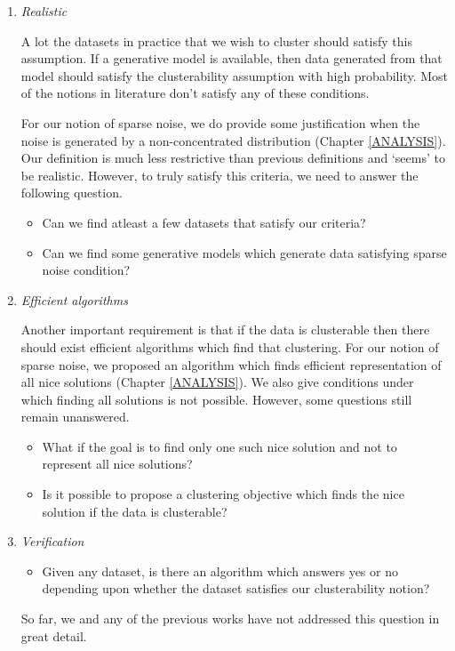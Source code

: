 \documentclass[letterpaper,12pt,titlepage,oneside,final]{book}
\begin{document}
\begin{enumerate}
\item \emph{Realistic}

A lot the datasets in practice that we wish to cluster should satisfy this assumption. If a generative model is available, then data generated from that model should satisfy the clusterability assumption with high probability. Most of the notions in literature don't satisfy any of these conditions.

For our notion of sparse noise, we do provide some justification when the noise is generated by a non-concentrated distribution (Chapter \ref{ANALYSIS}). Our definition is much less restrictive than previous definitions and `seems' to be realistic. However, to truly satisfy this criteria, we need to answer the following question. 
\begin{itemize}
\item Can we find atleast a few datasets that satisfy our criteria?
\item Can we find some generative models which generate data satisfying sparse noise condition?
\end{itemize}

\item \emph{Efficient algorithms}

Another important requirement is that if the data is clusterable then there should exist efficient algorithms which find that clustering. For our notion of sparse noise, we proposed an algorithm which finds efficient representation of all nice solutions (Chapter \ref{ANALYSIS}). We also give conditions under which finding all solutions is not possible. However, some questions still remain unanswered. \begin{itemize}
\item What if the goal is to find only one such nice solution and not to represent all nice solutions?
\item Is it possible to propose a clustering objective which finds the nice solution if the data is clusterable? 
\end{itemize}

\item \emph{Verification}
\begin{itemize}
\item Given any dataset, is there an algorithm which answers yes or no depending upon whether the dataset satisfies our clusterability notion? 
\end{itemize}
So far, we and any of the previous works have not addressed this question in great detail.


\end{enumerate}
\end{document}
